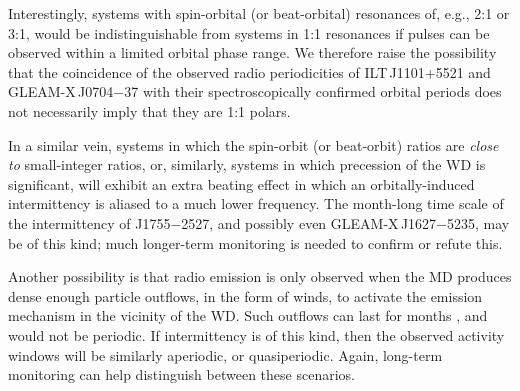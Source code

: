 \documentclass[fleqn,usenatbib]{mnras}
\newcommand{\src}{J1755$-$2527}
\begin{document}
Interestingly, systems with spin-orbital (or beat-orbital) resonances of, e.g., 2:1 or 3:1, would be indistinguishable from systems in 1:1 resonances if pulses can be observed within a limited orbital phase range.
We therefore raise the possibility that the coincidence of the observed radio periodicities of ILT\,J1101+5521 and GLEAM-X\,J0704$-$37 with their spectroscopically confirmed orbital periods does not necessarily imply that they are 1:1 polars.

In a similar vein, systems in which the spin-orbit (or beat-orbit) ratios are \emph{close to} small-integer ratios, or, similarly, systems in which precession of the WD is significant, will exhibit an extra beating effect in which an orbitally-induced intermittency is aliased to a much lower frequency.
The month-long time scale of the intermittency of \src{}, and possibly even GLEAM-X\,J1627$-$5235, may be of this kind; much longer-term monitoring is needed to confirm or refute this.

Another possibility is that radio emission is only observed when the MD produces dense enough particle outflows, in the form of winds, to activate the emission mechanism in the vicinity of the WD.
Such outflows can last for months \citep{2021ApJ...915...37W}, and would not be periodic.
If intermittency is of this kind, then the observed activity windows will be similarly aperiodic, or quasiperiodic.
Again, long-term monitoring can help distinguish between these scenarios.







\end{document}
